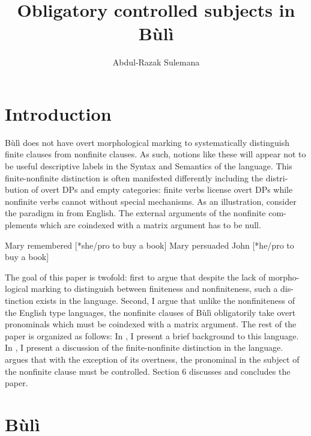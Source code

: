 \documentclass[output=paper,colorlinks,citecolor=brown]{langscibook}
\author{Abdul-Razak Sulemana\affiliation{Massachusetts Institute of Technology}}
\title{Obligatory controlled subjects in Bùlì}
\begin{document}
\maketitle 

\section{Introduction}\label{sec:sulemana:1}

Bùlì does not have overt morphological marking to systematically distinguish finite clauses from nonfinite clauses. As such, notions like these will appear not to be useful descriptive labels in the Syntax and Semantics of the language. This finite-nonfinite distinction is often manifested differently including the distri-bution of overt DPs and empty categories: finite verbs license overt DPs while nonfinite verbs cannot without special mechanisms. As an illustration, consider the paradigm in  from English. The external arguments of the nonfinite com-plements which are coindexed with a matrix argument has to be null.

\ea%
    \label{ex:sulemana:1}
    \ea%
    \label{ex:sulemana:1a}
    Mary remembered [*she/pro to buy a book]
    \ex%
    \label{ex:sulemana:1b}
    Mary persuaded John [*he/pro to buy a book]
    \z
\z

The goal of this paper is twofold: first to argue that despite the lack of morpho-logical marking to distinguish between finiteness and nonfiniteness, such a dis-tinction exists in the language. Second, I argue that unlike the nonfiniteness of the English type languages, the nonfinite clauses of Bùlì obligatorily take overt pronominals which must be coindexed with a matrix argument. The rest of the paper is organized as follows: In , I present a brief background to this language. In , I present a discussion of the finite-nonfinite distinction in the language.  argues that with the exception of its overtness, the pronominal in the subject of the nonfinite clause must be controlled. Section 6 discusses and concludes the paper.

\section{Bùlì}\label{sec:sulemana:2}
\end{document}
